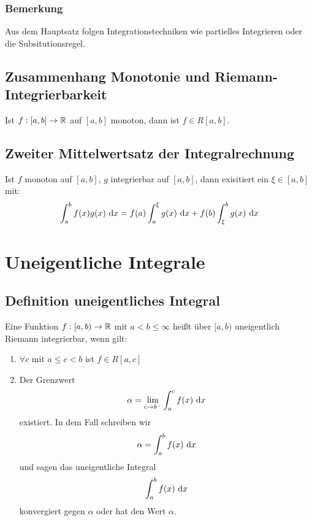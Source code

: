 \subsubsection{Bemerkung}
Aus dem Hauptsatz folgen Integrationstechniken wie partielles Integrieren oder
die Subsitutionsregel.

\subsection{Zusammenhang Monotonie und Riemann-Integrierbarkeit}
Ist $f: [a, b] \rightarrow \mathbb{R}$ auf $[a,b]$ monoton, dann ist $f \in R[a,b]$.

\subsection{Zweiter Mittelwertsatz der Integralrechnung}
Ist $f$ monoton auf $[a,b]$, $g$ integrierbar auf $[a,b]$, dann exisitiert ein
$\xi \in [a,b]$ mit:
\begin{equation*}
    \int_a^b f(x)g(x) \text{ d}x = f(a) \int_a^\xi g(x) \text{ d}x +
        f(b)\int_\xi^b g(x) \text{ d}x
\end{equation*}

\section{Uneigentliche Integrale}


\subsection{Definition uneigentliches Integral}
Eine Funktion $f: [a, b) \rightarrow \mathbb{R}$ mit $a < b \leq \infty$ heißt über
$[a,b)$ uneigentlich Riemann integrierbar, wenn gilt:
\begin{enumerate}[label= (\alph*)]
    \item $\forall c$ mit $a \leq c < b$ ist $f \in R[a, c]$
    \item Der Grenzwert
        \begin{equation*}
            \alpha = \lim_{c \rightarrow b^-} \int_a^c f(x) \text{ d}x
        \end{equation*}
        existiert. In dem Fall schreiben wir
        \begin{equation*}
            \alpha = \int_a^b f(x) \text{ d}x
        \end{equation*}
        und sagen das uneigentliche Integral
        \begin{equation*}
            \int_a^b f(x) \text{ d}x
        \end{equation*}
        konvergiert gegen $\alpha$ oder hat den Wert $\alpha$.
\end{enumerate}

